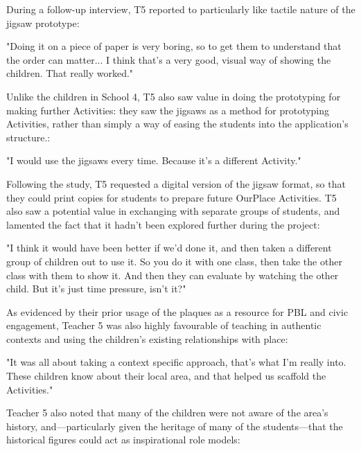 During a follow-up interview, T5 reported to particularly like tactile nature of the jigsaw prototype: 

\begin{displayquote}
"Doing it on a piece of paper is very boring, so to get them to understand that the order can matter... I think that's a very good, visual way of showing the children. That really worked."
\end{displayquote}

Unlike the children in School 4, T5 also saw value in doing the prototyping for making further Activities: they saw the jigsaws as a method for prototyping Activities, rather than simply a way of easing the students into the application's structure.: 

\begin{displayquote}
"I would use the jigsaws every time. Because it's a different Activity."
\end{displayquote}

Following the study, T5 requested a digital version of the jigsaw format, so that they could print copies for students to prepare future OurPlace Activities. T5 also saw a potential value in exchanging with separate groups of students, and lamented the fact that it hadn't been explored further during the project: 

\begin{displayquote}
"I think it would have been better if we'd done it, and then taken a different group of children out to use it. So you do it with one class, then take the other class with them to show it. And then they can evaluate by watching the other child. But it's just time pressure, isn't it?"
\end{displayquote}

As evidenced by their prior usage of the plaques as a resource for PBL and civic engagement, Teacher 5 was also highly favourable of teaching in authentic contexts and using the children's existing relationships with place: 

\begin{displayquote}
"It was all about taking a context specific approach, that's what I'm really into. These children know about their local area, and that helped us scaffold the Activities."
\end{displayquote}

Teacher 5 also noted that many of the children were not aware of the area's history, and---particularly given the heritage of many of the students---that the historical figures could act as inspirational role models: 

